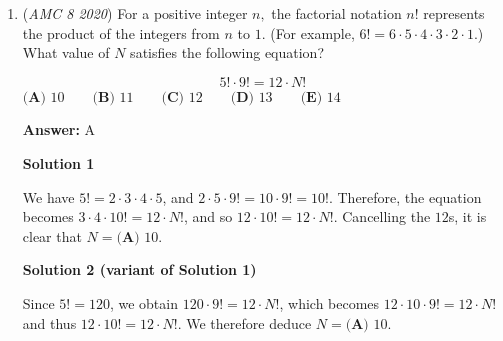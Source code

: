 \begin{enumerate}
 \textbf{Answer: }E



\textbf{Solution 1}

Naomi travels $6$ miles in a time of $10$ minutes, which is equivalent to $\dfrac{1}{6}$ of an hour. Since $\text{speed} = \frac{\text{distance}}{\text{time}}$, her speed is $\frac{6}{\left(\frac{1}{6}\right)} = 36$ mph. By a similar calculation, Maya's speed is $12$ mph, so the answer is $36-12 = \boxed{\textbf{(E) }24}$.

 



\textbf{Solution 2 (Variant of Solution 1)}

Naomi's speed of $6$ miles in $10$ minutes is equivalent to $6 \cdot 6 = 36$ miles per hour, while Maya's speed of $6$ miles in $30$ minutes (i.e. half an hour) is equivalent to $6 \cdot 2 = 12$ miles per hour. The difference is consequently $36-12=\boxed{\textbf{(E) }24}$.

 ==Video Solution by Math-X (sofuckingstupidthisguy hes always showing off such a mf. And hes like a 40 year old btw

 


	\item (\textit{AMC 8 2020}) For a positive integer $n,$ the factorial notation $n!$ represents the product of the integers
from $n$ to $1$. (For example, $6! = 6 \cdot 5 \cdot 4 \cdot 3 \cdot 2 \cdot 1$.) What value of $N$ satisfies the following equation?

 \[5! \cdot 9! = 12 \cdot N!\]
$\textbf{(A) }10 \qquad \textbf{(B) }11 \qquad \textbf{(C) }12 \qquad \textbf{(D) }13 \qquad \textbf{(E) }14$

 \textbf{Answer: }A



\textbf{Solution 1}

We have $5! = 2 \cdot 3 \cdot 4 \cdot 5$, and $2 \cdot 5 \cdot 9! = 10 \cdot 9! = 10!$. Therefore, the equation becomes $3 \cdot 4 \cdot 10! = 12 \cdot N!$, and so $12 \cdot 10! = 12 \cdot N!$. Cancelling the $12$s, it is clear that $N=\boxed{\textbf{(A) }10}$.

 



\textbf{Solution 2 (variant of Solution 1)}

Since $5! = 120$, we obtain $120\cdot 9!=12\cdot N!$, which becomes $12\cdot 10\cdot 9!=12\cdot N!$ and thus $12 \cdot 10!=12\cdot N!$. We therefore deduce $N=\boxed{\textbf{(A) }10}$.


\end{enumerate}
